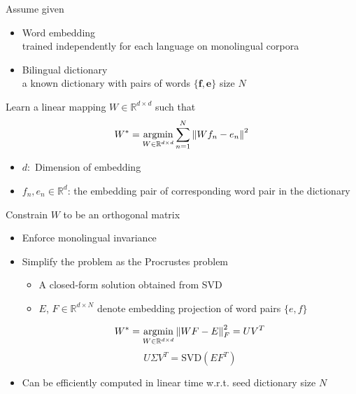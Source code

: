 \documentclass[11pt, a4paper, landscape]{article}
\newcommand*{\argmin}{\ensuremath{\operatornamewithlimits{argmin}}\xspace}
\begin{document}
	
	\vfill	
	\NewPage
	\vfill
	Assume given
	\begin{itemize}
		\item Word embedding \\
		trained  independently for each language on monolingual corpora
		\item Bilingual dictionary \\
		a known dictionary with pairs of words ${ \{ \bm{f}, \bm{e} \} }$ size $N$ 
	\end{itemize}
	
	
	
	Learn a linear mapping ${W \in \mathbb{R}^{d \times d}}$ such that
	\[W^*= \argmin\limits_{W \in \mathbb{R}^{d \times d}} {\sum_{n=1}^{N} {\lVert Wf_n -e_n \rVert}^2} \]
	\begin{itemize}
		\item ${d:}$ Dimension of embedding
		\item $f_n, e_n \in \mathbb{R}^d $: the embedding pair of corresponding word pair in the dictionary
	\end{itemize}
	\vfill
	
	
	
	\NewPage
	\vfill
	Constrain ${W}$ to be an orthogonal matrix
	\begin{itemize}
		\item Enforce monolingual invariance
		
		\item Simplify the problem as the Procrustes problem
		
		\begin{itemize}
			\item A closed-form solution obtained from SVD
			\item $E$, $F \in \mathbb{R}^{d\times N}$ denote embedding projection of word pairs ${\{e,f\}}$
		\end{itemize}
		
		\[ W^* = \argmin\limits_{W \in \mathbb{R}^{d \times d}} {\lVert WF-E\lVert}_F^2  =  UV^T\]
		\[ U\varSigma V^T =  \textrm{SVD}(EF^T)\]
		
		\item Can be efficiently computed in linear time  w.r.t. seed dictionary size $N$
	\end{itemize}
	\vfill
	
\end{document}
